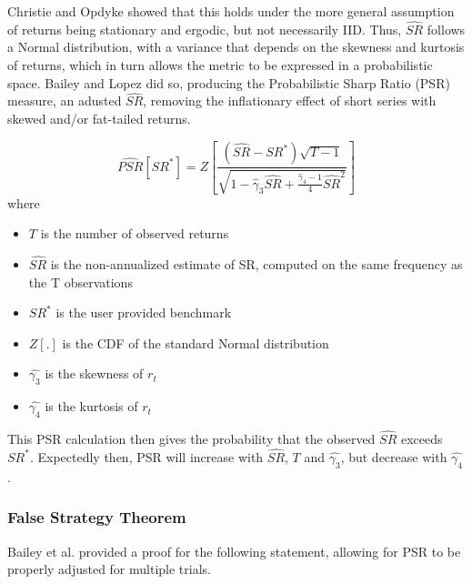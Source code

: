 \documentclass[a4paper,11pt,oneside]{article}
\theoremstyle{plain}
\theoremstyle{definition}
\begin{document}
	Christie \cite{Christie} and Opdyke \cite{Opdyke} showed that this holds under the more general assumption of returns being stationary and ergodic, but not necessarily IID. Thus, $\widehat{SR}$ follows a Normal distribution, with a variance that depends on the skewness and kurtosis of returns, which in turn allows the metric to be expressed in a probabilistic space. Bailey and Lopez did so, producing the Probabilistic Sharp Ratio (PSR) measure, an adusted $\widehat{SR}$, removing the inflationary effect of short series with skewed and/or fat-tailed returns. 
	
	\begin{equation}\label{eq_psr}
	\widehat{P S R}\left[S R^{*}\right]=Z\left[\frac{\left(\widehat{S R}-S R^{*}\right) \sqrt{T-1}}{\sqrt{1-\hat{\gamma}_{3} \widehat{S R}+\frac{\hat{\gamma}_{4}-1}{4} \widehat{S R}^{2}}}\right]
	\end{equation}
	where
	\begin{itemize}
		\item [] $T$ is the number of observed returns
		\item [] $\widehat{SR}$ is the non-annualized estimate of SR, computed on the same frequency as the T observations
		\item [] $SR^*$ is the user provided benchmark
		\item [] $Z[.]$ is the CDF of the standard Normal distribution
		\item [] $\hat{\gamma_3}$ is the skewness of $r_t$
		\item [] $\hat{\gamma_4}$ is the kurtosis of $r_t$	
	\end{itemize}

	This PSR calculation then gives the probability that the observed $\widehat{SR}$ exceeds $SR^*$. Expectedly then, PSR will increase with $\widehat{SR}$, $T$ and $\hat{\gamma_3}$, but decrease with $\hat{\gamma_4}$.
		
	\subsubsection{False Strategy Theorem}
	
	Bailey et al. \cite{Baileyetal2014} provided a proof for the following statement, allowing for PSR to be properly adjusted for multiple trials.
	
\end{document}
